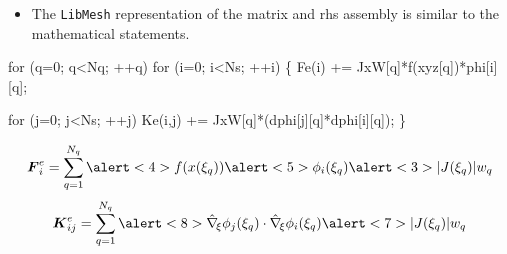       
\begin{frame}[fragile,t]  
	\begin{block}{}
	  \begin{itemize}    
	  \item{ The \texttt{LibMesh} representation of the matrix and
	    rhs assembly is similar to the mathematical statements.
	  }
	  \end{itemize}
	\end{block}
\small
\begin{semiverbatim}
for (q=0; q<Nq; ++q) 
  for (i=0; i<Ns; ++i) \{
    \alert<2>{Fe(i)   += \alert<3>{JxW[q]}*\alert<4>{f(xyz[q])}*\alert<5>{phi[i][q]};}
    
    for (j=0; j<Ns; ++j)
      \alert<6>{Ke(i,j) += \alert<7>{JxW[q]}*(\alert<8>{dphi[j][q]*dphi[i][q]});}
  \}
\end{semiverbatim}
{
  \begin{equation}
    \nonumber
    \bv{F}^e_{i} = 
    \sum_{q=1}^{N_q}
    \alert<4>{f(x(\xi_q))}
    \alert<5>{\phi_i(\xi_q)}
    \alert<3>{|J(\xi_q)| w_q}
  \end{equation}
}
{
  \begin{equation}
  \nonumber
  \bv{K}^e_{ij} =
  \sum_{q=1}^{N_q}
  \alert<8>{
    \hat{\nabla}_{\!\xi} \phi_j(\xi_q) \cdot
    \hat{\nabla}_{\!\xi} \phi_i(\xi_q)
    }
  \alert<7>{|J(\xi_q)| w_q}
  \end{equation}
}
\end{frame}
